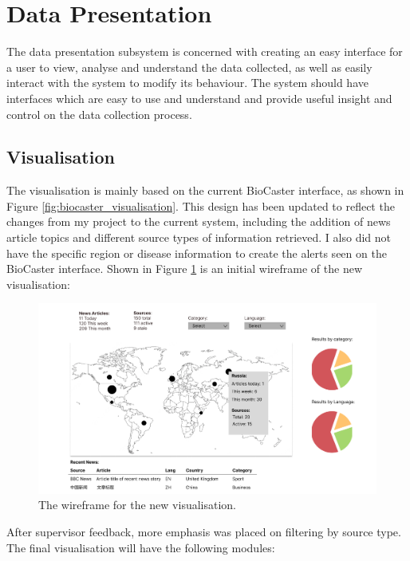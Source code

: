 \documentclass{l4proj}
\begin{document}
\section{Data Presentation}
The data presentation subsystem is concerned with creating an easy interface for a user to view, analyse and understand the data collected, as well as easily interact with the system to modify its behaviour. The system should have interfaces which are easy to use and understand and provide useful insight and control on the data collection process.

\subsection{Visualisation}
The visualisation is mainly based on the current BioCaster interface, as shown in Figure \ref{fig:biocaster_visualisation}. This design has been updated to reflect the changes from my project to the current system, including the addition of news article topics and different source types of information retrieved. I also did not have the specific region or disease information to create the alerts seen on the BioCaster interface. Shown in Figure \ref{fig:visualisation-wireframe} is an initial wireframe of the new visualisation: \par
 \begin{figure}[h]
\centering
\includegraphics[width=\textwidth]{images/visualisation-wireframe.png}
\caption{The wireframe for the new visualisation.}
\label{fig:visualisation-wireframe}
\end{figure}
After supervisor feedback, more emphasis was placed on filtering by source type. The final visualisation will have the following modules:
\end{document}
